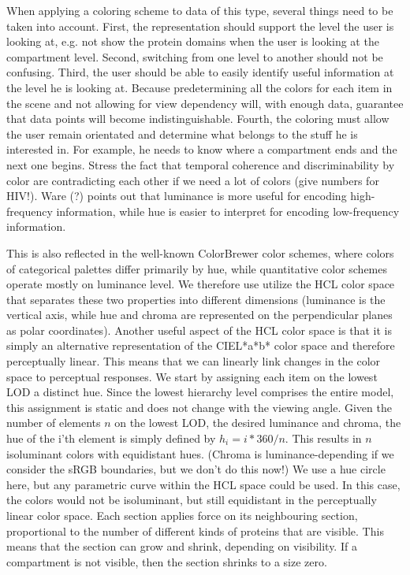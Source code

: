 \documentclass[review,journal]{vgtc}         %
\begin{document}
When applying a coloring scheme to data of this type, several things need to be taken into account. 
First, the representation should support the level the user is looking at, e.g. not show the protein domains when the user is looking at the compartment level. Second, switching from one level to another should not be confusing.
Third, the user should be able to easily identify useful information at the level he is looking at. Because predetermining all the colors for each item in the scene and not allowing for view dependency will, with enough data, guarantee that data points will become indistinguishable. 
Fourth, the coloring must allow the user remain orientated and determine what belongs to the stuff he is interested in. 
For example, he needs to know where a compartment ends and the next one begins.
Stress the fact that temporal coherence and discriminability by color are contradicting each other if we need a lot of colors (give numbers for HIV!). 
Ware (?) points out that luminance is more useful for encoding high-frequency information, while hue is easier to interpret for encoding low-frequency information. 

This is also reflected in the well-known ColorBrewer color schemes, where colors of categorical palettes differ primarily by hue, while quantitative color schemes operate mostly on luminance level.  
We therefore use utilize the HCL color space that separates these two properties into different dimensions (luminance is the vertical axis, while hue and chroma are represented on the perpendicular planes as polar coordinates). 
Another useful aspect of the HCL color space is that it is simply an alternative representation of the CIEL*a*b* color space and therefore perceptually linear. This means that we can linearly link changes in the color space to perceptual responses. 
We start by assigning each item on the lowest LOD a distinct hue. 
Since the lowest hierarchy level comprises the entire model, this assignment is static and does not change with the viewing angle. 
Given the number of elements $n$ on the lowest LOD, the desired luminance and chroma, the hue of the i’th element is simply defined by $h_i=i*360/n$. 
This results in $n$ isoluminant colors with equidistant hues. 
(Chroma is luminance-depending if we consider the sRGB boundaries, but we don’t do this now!)
We use a hue circle here, but any parametric curve within the HCL space could be used. In this case, the colors would not be isoluminant, but still equidistant in the perceptually linear color space. 
Each section applies force on its neighbouring section, proportional to the number of different kinds of proteins that are visible. 
This means that the section can grow and shrink, depending on visibility. If a compartment is not visible, then the section shrinks to a size zero. 
\end{document}
